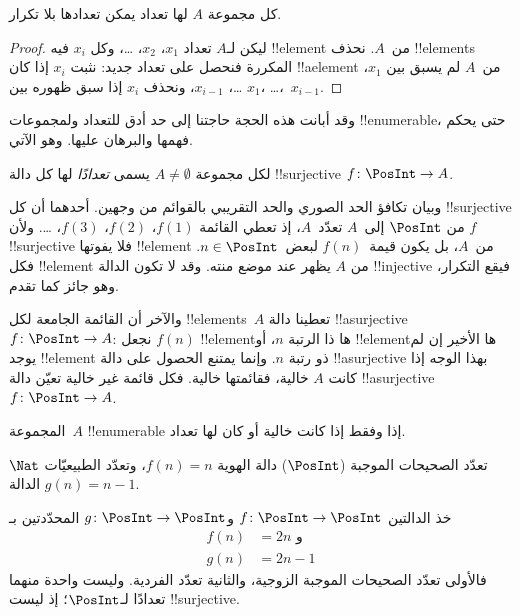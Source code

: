 \documentclass[../../../include/open-logic-section]{subfiles}
\begin{document}
\begin{prop}
كل مجموعة $A$ لها تعداد يمكن تعدادها بلا تكرار.
\end{prop}

\begin{proof}
ليكن لـ$A$ تعداد $x_1$، $x_2$، \dots{}، وكل $x_i$ فيه !!{element}
من~$A$. نحذف !!{element}s المكررة فنحصل على تعداد جديد:
نثبت $x_i$ إذا كان !!a{element} من~$A$ لم يسبق بين
$x_1$، \dots، $x_{i-1}$، ونحذف $x_i$ إذا سبق ظهوره بين
$x_1$، \dots،~$x_{i-1}$.
\end{proof}

وقد أبانت هذه الحجة حاجتنا إلى حد أدق للتعداد ولمجموعات
!!{enumerable}، حتى يحكم فهمها والبرهان عليها. وهو الآتي.

\begin{defn}
لكل مجموعة $A \neq \emptyset$ يسمى \emph{تعدادًا} لها كل دالة
!!{surjective} $f \colon \PosInt \to A$.
\end{defn}

\begin{explain}
وبيان تكافؤ الحد الصوري والحد التقريبي بالقوائم من وجهين.
أحدهما أن كل !!{surjective} من $\PosInt$ إلى~$A$ تعدّد~$A$،
إذ تعطي القائمة $f(1)$، $f(2)$، $f(3)$، \dots.
ولأن $f$ !!{surjective} فلا يفوتها !!{element} من~$A$، بل يكون
قيمة~$f(n)$ لبعض~$n \in \PosInt$. فكل !!{element} من $A$ يظهر
عند موضع منته. وقد لا تكون الدالة !!{injective} فيقع التكرار،
وهو جائز كما تقدم.

والآخر أن القائمة الجامعة لكل !!{element}s~$A$ تعطينا دالة
!!a{surjective} $f\colon \PosInt \to A$: نجعل $f(n)$
!!{element}ها ذا الرتبة $n$، أو !!{element}ها الأخير إن لم يوجد
!!{element} ذو رتبة $n$. وإنما يمتنع الحصول على دالة
!!a{surjective} بهذا الوجه إذا كانت $A$ خالية، فقائمتها خالية.
فكل قائمة غير خالية تعيّن دالة !!a{surjective} $f\colon \PosInt \to A$.
\end{explain}

\begin{defn}
المجموعة~$A$ !!{enumerable} إذا وفقط إذا كانت خالية أو كان لها تعداد.
\end{defn}

\begin{ex}
تعدّد الصحيحات الموجبة ($\PosInt$) دالة الهوية $f(n) = n$،
وتعدّد الطبيعيّات $\Nat$ الدالة $g(n) = n - 1$.
\end{ex}

\begin{ex}
خذ الدالتين $f\colon \PosInt \to \PosInt$ و$g \colon \PosInt \to
\PosInt$ المحدّدتين بـ
\begin{align*}
f(n) & = 2n \text{ و}\\
g(n) & = 2n - 1
\end{align*}
فالأولى تعدّد الصحيحات الموجبة الزوجية، والثانية تعدّد الفردية.
وليست واحدة منهما تعدادًا لـ$\PosInt$؛ إذ ليست !!{surjective}.
\end{ex}
\end{document}
